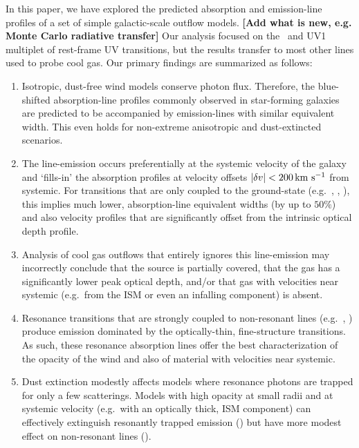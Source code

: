 \documentclass[12pt,preprint]{aastex}
\begin{document}
In this paper, we have explored the predicted absorption and
emission-line profiles of a set of simple galactic-scale outflow
models.  {\bf [Add what is new, e.g. Monte Carlo radiative transfer]}
Our analysis focused on the \mgiid\ and  UV1
multiplet of rest-frame UV transitions, but the results transfer to
most other lines used to probe cool gas.  Our primary
findings are summarized as follows:

\begin{enumerate}

\item Isotropic, dust-free wind models conserve photon flux.
  Therefore, the blue-shifted absorption-line profiles commonly
  observed in star-forming galaxies are predicted to be accompanied by
  emission-lines with similar equivalent width.  This even holds for
  non-extreme anisotropic and dust-extincted scenarios.

\item The line-emission occurs preferentially at the systemic velocity
  of the galaxy and `fills-in' the absorption profiles at velocity
  offsets $|\delta v| < 200 \, {\rm km~s^{-1}}$ from systemic.  For transitions that
  are only coupled to the ground-state (e.g.\ , \lya,
  ),  this implies much lower, absorption-line equivalent widths (by up to
  $50\%$) and also velocity profiles that are significantly offset
  from the intrinsic optical depth profile.

\item Analysis of cool gas outflows that entirely ignores this
line-emission may incorrectly conclude that the source is partially
covered, that the gas has a significantly lower peak optical depth, and/or that 
gas with velocities near systemic (e.g.\ from the ISM or even
an infalling component) is absent.   


\item Resonance transitions that are strongly coupled to
non-resonant lines (e.g.\ , ) 
produce emission dominated by the
optically-thin, fine-structure transitions.  As such, these resonance
absorption lines offer the best
characterization of the opacity of the wind and also of material 
with velocities near systemic.  

\item  Dust extinction modestly affects 
  models where resonance photons are trapped for only a few scatterings.  Models
  with high opacity at small radii and at systemic velocity (e.g.\
  with an
  optically thick, ISM component)  can effectively extinguish
  resonantly trapped emission () but have more modest
  effect on non-resonant lines (\feiis).


\end{enumerate}
\end{document}
